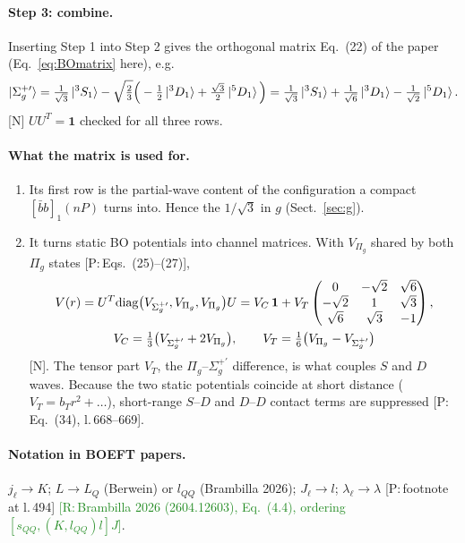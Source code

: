 \documentclass[11pt,a4paper]{article}
\newcommand{\tagP}[1]{\textcolor{blue!65!black}{\textsf{\small[P:\,#1]}}}
\newcommand{\tagR}[1]{\textcolor{ForestGreen}{\textsf{\small[R:\,#1]}}}
\newcommand{\tagN}{\textcolor{red!70!black}{\textsf{\small[N]}}}
\renewcommand{\bbnP}{[\bar bb]_1(nP)}
\begin{document}
\paragraph{Step 3: combine.} Inserting Step 1 into Step 2 gives the orthogonal matrix Eq.~(22) of the paper (Eq.~\eqref{eq:BOmatrix} here), e.g.
\begin{equation}
\ket{\Sigma_g^{+\prime}}=\tfrac{1}{\sqrt3}\ket{^3S_1}-\sqrt{\tfrac23}\Big(-\tfrac12\ket{^3D_1}+\tfrac{\sqrt3}{2}\ket{^5D_1}\Big)=\tfrac{1}{\sqrt3}\ket{^3S_1}+\tfrac{1}{\sqrt6}\ket{^3D_1}-\tfrac{1}{\sqrt2}\ket{^5D_1}.
\end{equation}
\tagN{} $UU^T=\mathbf 1$ checked for all three rows.

\paragraph{What the matrix is used for.}
\begin{enumerate}
\item Its first row is the partial-wave content of the configuration a compact $\bbnP$ turns into. Hence the $1/\sqrt3$ in $g$ (Sect.~\ref{sec:g}).
\item It turns static BO potentials into channel matrices. With $V_{\Pi_g}$ shared by both $\Pi_g$ states \tagP{Eqs.~(25)--(27)},
\begin{gather}
V(r)=U^T{\rm diag}\big(V_{\Sigma_g^{+\prime}},V_{\Pi_g},V_{\Pi_g}\big)U=V_C\,\mathbf 1+V_T\begin{pmatrix}0&-\sqrt2&\sqrt6\\-\sqrt2&1&\sqrt3\\\sqrt6&\sqrt3&-1\end{pmatrix},\\
V_C=\tfrac13\big(V_{\Sigma_g^{+\prime}}+2V_{\Pi_g}\big),\qquad V_T=\tfrac16\big(V_{\Pi_g}-V_{\Sigma_g^{+\prime}}\big)
\end{gather}
\tagN. The tensor part $V_T$, the $\Pi_g$--$\Sigma_g^{+\prime}$ difference, is what couples $S$ and $D$ waves. Because the two static potentials coincide at short distance ($V_T=b_Tr^2+\dots$), short-range $S$--$D$ and $D$--$D$ contact terms are suppressed \tagP{Eq.~(34), l.\,668--669}.
\end{enumerate}

\paragraph{Notation in BOEFT papers.} $j_\ell\to K$; $L\to L_Q$ (Berwein) or $l_{QQ}$ (Brambilla 2026); $J_\ell\to l$; $\lambda_\ell\to\lambda$ \tagP{footnote at l.\,494} \tagR{Brambilla 2026 (2604.12603), Eq.~(4.4), ordering $[s_{QQ},(K,l_{QQ})l]J$}.
\end{document}
